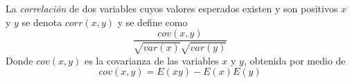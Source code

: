 La \emph{correlación} de dos variables cuyos valores esperados existen y son positivos $x$ y $y$ se denota $corr(x,y)$ y se define como
\begin{equation}
\frac{cov(x,y)}{\sqrt{var(x)}\sqrt{var(y)}}
\end{equation}
Donde $cov(x,y)$ es la covarianza de las variables $x$ y $y$, obtenida por medio de
\begin{equation}
cov(x,y)=E(xy)-E(x)E(y)
\end{equation}
